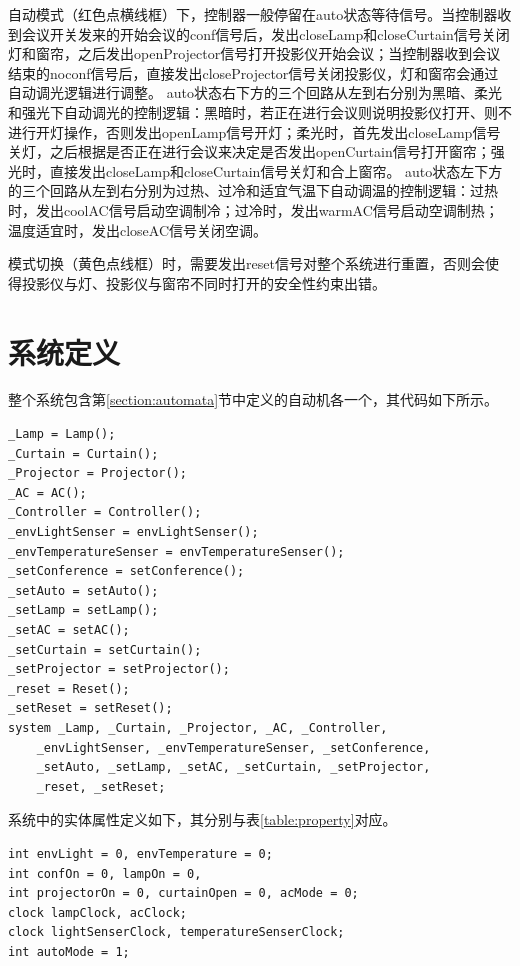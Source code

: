 \documentclass[journal, a4paper]{IEEEtran}
\begin{document}
自动模式（红色点横线框）下，控制器一般停留在auto状态等待信号。当控制器收到会议开关发来的开始会议的conf信号后，发出closeLamp和closeCurtain信号关闭灯和窗帘，之后发出openProjector信号打开投影仪开始会议；当控制器收到会议结束的noconf信号后，直接发出closeProjector信号关闭投影仪，灯和窗帘会通过自动调光逻辑进行调整。
auto状态右下方的三个回路从左到右分别为黑暗、柔光和强光下自动调光的控制逻辑：黑暗时，若正在进行会议则说明投影仪打开、则不进行开灯操作，否则发出openLamp信号开灯；柔光时，首先发出closeLamp信号关灯，之后根据是否正在进行会议来决定是否发出openCurtain信号打开窗帘；强光时，直接发出closeLamp和closeCurtain信号关灯和合上窗帘。
auto状态左下方的三个回路从左到右分别为过热、过冷和适宜气温下自动调温的控制逻辑：过热时，发出coolAC信号启动空调制冷；过冷时，发出warmAC信号启动空调制热；温度适宜时，发出closeAC信号关闭空调。

模式切换（黄色点线框）时，需要发出reset信号对整个系统进行重置，否则会使得投影仪与灯、投影仪与窗帘不同时打开的安全性约束出错。

\section{系统定义}
\label{section:system}

整个系统包含第\ref{section:automata}节中定义的自动机各一个，其代码如下所示。

\lstset{numbers=right}
\begin{lstlisting}
_Lamp = Lamp();
_Curtain = Curtain();
_Projector = Projector();
_AC = AC();
_Controller = Controller();
_envLightSenser = envLightSenser();
_envTemperatureSenser = envTemperatureSenser();
_setConference = setConference();
_setAuto = setAuto();
_setLamp = setLamp();
_setAC = setAC();
_setCurtain = setCurtain();
_setProjector = setProjector();
_reset = Reset();
_setReset = setReset();
system _Lamp, _Curtain, _Projector, _AC, _Controller,
    _envLightSenser, _envTemperatureSenser, _setConference,
    _setAuto, _setLamp, _setAC, _setCurtain, _setProjector,
    _reset, _setReset;
\end{lstlisting}

系统中的实体属性定义如下，其分别与表\ref{table:property}对应。

\lstset{numbers=left}
\begin{lstlisting}
int envLight = 0, envTemperature = 0;
int confOn = 0, lampOn = 0,
int projectorOn = 0, curtainOpen = 0, acMode = 0;
clock lampClock, acClock;
clock lightSenserClock, temperatureSenserClock;
int autoMode = 1;
\end{lstlisting}
\end{document}

